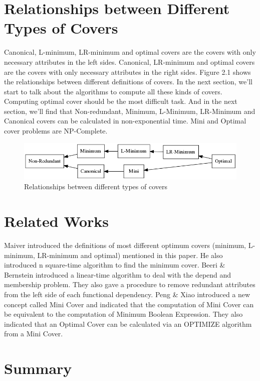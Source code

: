 \documentclass[11pt]{book}
\begin{document}
\section{Relationships between Different Types of Covers}

Canonical, L-minimum, LR-minimum and optimal covers are the covers with only necessary attributes in the left sides. Canonical, LR-minimum and optimal covers are the covers with only necessary attributes in the right sides. Figure 2.1 shows the relationships between different definitions of covers. In the next section, we'll start to talk about the algorithms to compute all these kinds of covers. Computing optimal cover should be the most difficult task. And in the next section, we'll find that Non-redundant, Minimum, L-Minimum, LR-Minimum and Canonical covers can be calculated in non-exponential time. Mini and Optimal cover problems are NP-Complete.

\begin{figure}
	\centering
	\includegraphics[width=\textwidth]{./diagrams/types-of-covers.png}
	\caption{Relationships between different types of covers}
\end{figure}

\section{Related Works}

Maiver \cite{maier1980minimum} introduced the definitions of most different optimum covers (minimum, L-minimum, LR-minimum and optimal) mentioned in this paper. He also introduced n square-time algorithm to find the minimum cover. Beeri \& Bernstein \cite{beeri1979computational} introduced a linear-time algorithm to deal with the depend and membership problem. They also gave a procedure to remove redundant attributes from the left side of each functional dependency. Peng \& Xiao \cite{peng2016optimal} introduced a new concept called Mini Cover and indicated that the computation of Mini Cover can be equivalent to the computation of Minimum Boolean Expression. They also indicated that an Optimal Cover can be calculated via an OPTIMIZE algorithm from a Mini Cover.

\section{Summary}
\end{document}

